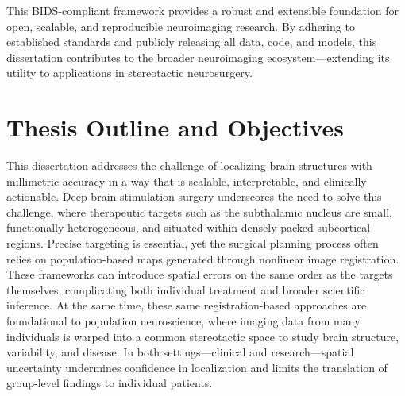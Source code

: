 This BIDS-compliant framework provides a robust and extensible foundation for open, scalable, and reproducible neuroimaging research. By adhering to established standards and publicly releasing all data, code, and models, this dissertation contributes to the broader neuroimaging ecosystem—extending its utility to applications in stereotactic neurosurgery.

\section{Thesis Outline and Objectives}

This dissertation addresses the challenge of localizing brain structures with millimetric accuracy in a way that is scalable, interpretable, and clinically actionable. Deep brain stimulation surgery underscores the need to solve this challenge, where therapeutic targets such as the subthalamic nucleus are small, functionally heterogeneous, and situated within densely packed subcortical regions. Precise targeting is essential, yet the surgical planning process often relies on population-based maps generated through nonlinear image registration. These frameworks can introduce spatial errors on the same order as the targets themselves, complicating both individual treatment and broader scientific inference. At the same time, these same registration-based approaches are foundational to population neuroscience, where imaging data from many individuals is warped into a common stereotactic space to study brain structure, variability, and disease. In both settings—clinical and research—spatial uncertainty undermines confidence in localization and limits the translation of group-level findings to individual patients.


